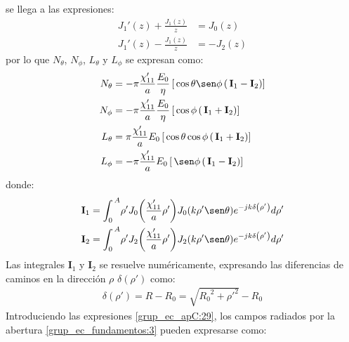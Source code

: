 se llega a las expresiones:
\begin{align}
{J_1}'\!\left(z\right) + \frac{J_1\!\left(z\right)}{z} &= J_0\!\left(z\right)
\label{ec_apC:131}\\
{J_1}'\!\left(z\right) - \frac{J_1\!\left(z\right)}{z} &= -J_2\!\left(z\right)
\label{ec_apC:132}
\end{align}
por lo que $N_{\theta}$, $N_{\phi}$, $L_{\theta}$ y $L_{\phi}$ se expresan como:
\begin{subequations}
\label{grup_ec_apC:29}
\begin{align}
N_{\theta} &= - \pi\frac{\chi '_{11}}{a}\dfrac{E_0}{\eta}\left[\,\cos\theta\sen\phi\left(\,\mathbf{I}_1 - \mathbf{I}_2\right)\right]
\label{ec_apC:133}\\
N_{\phi} &= - \pi\frac{\chi '_{11}}{a}\dfrac{E_0}{\eta}\left[\,\cos\phi\left(\,\mathbf{I}_1 + \mathbf{I}_2\right)\right]
\label{ec_apC:134}\\
L_{\theta} &= \pi\frac{\chi '_{11}}{a}E_0\left[\,\cos\theta\cos\phi\left(\,\mathbf{I}_1 +\mathbf{I}_2\right)\right]
\label{ec_apC:135}\\
L_{\phi} &= - \pi\frac{\chi '_{11}}{a}E_0\left[\,\sen\phi\left(\,\mathbf{I}_1 - \mathbf{I}_2\right)\right]
\label{ec_apC:136}
\end{align}
\end{subequations}
donde:
\begin{align}
\mathbf{I}_1 &= \int_{0}^{\,A}\!\rho 'J_0\!\left(\frac{\chi '_{11}}{a}\rho '\right)\!J_0\!\left(k\rho '\sen\theta\right)\!e^{-jk\delta\left(\rho '\right)}d\rho '
\label{ec_apC:137}\\
\mathbf{I}_2 &= \int_{0}^{\,A}\!\rho 'J_2\!\left(\frac{\chi '_{11}}{a}\rho '\right)\!J_2\!\left(k\rho '\sen\theta\right)\!e^{-jk\delta\left(\rho '\right)}d\rho '
\label{ec_apC:138}
\end{align}
Las integrales $\mathbf{I}_1$ y $\mathbf{I}_2$  se resuelve numéricamente, expresando las diferencias de caminos en la dirección $\rho$ $\delta\left(\rho '\right)$ como:
\begin{align}
\delta\left(\rho '\right) = R - R_0 = \sqrt{{R_0}^2 + {\rho '}^2} - R_0
\label{ec_apC:139}
\end{align}
Introduciendo las expresiones \eqref{grup_ec_apC:29}, los campos radiados por la abertura \eqref{grup_ec_fundamentos:3} pueden expresarse como:
